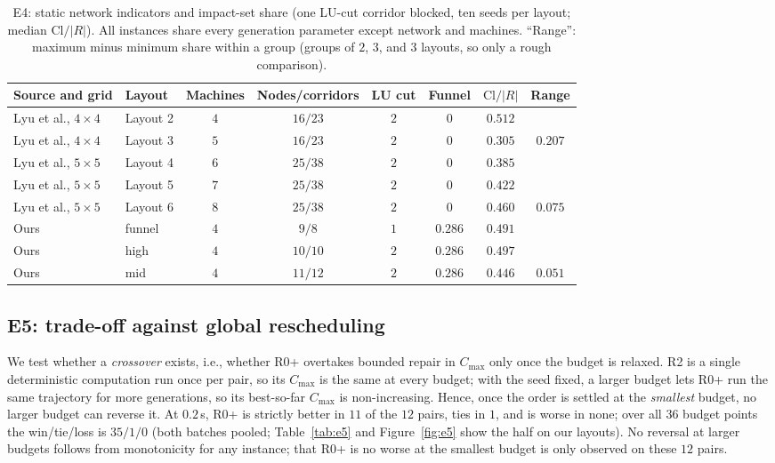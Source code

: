 \documentclass[manuscript,screen,review]{acmart}
\newcommand{\EfiveCells}{12}        %
\newcommand{\EfivePts}{36}          %
\newcommand{\EfiveWLT}{35/1/0}      %
\newcommand{\EfiveWinMin}{11}       %
\newcommand{\EfiveTieMin}{1}        %
\newcommand{\PubCloSpread}{0.207}
\newcommand{\PubCloSpreadBig}{0.075}
\newcommand{\SelfCloSpread}{0.051}
\begin{document}
\begin{table}[t]
\centering
\caption{E4: static network indicators and impact-set share (one LU-cut corridor blocked, ten seeds per layout; median \(\mathrm{Cl}/|R|\)). All instances share every generation parameter except network and machines.
``Range'': maximum minus minimum share within a group (groups of \(2\), \(3\), and \(3\) layouts, so only a rough comparison).}
\label{tab:e4pub}
\small
\begin{tabular}{@{}llcccccc@{}}
\toprule
Source and grid & Layout & Machines & Nodes/corridors & LU cut & Funnel & \(\mathrm{Cl}/|R|\) & Range \\
\midrule
Lyu et al., \(4\times4\) & Layout 2 & \(4\) & \(16/23\) & \(2\) & \(0\) & \(0.512\) & \\
Lyu et al., \(4\times4\) & Layout 3 & \(5\) & \(16/23\) & \(2\) & \(0\) & \(0.305\) & \(\PubCloSpread\) \\
\cmidrule{1-8}
Lyu et al., \(5\times5\) & Layout 4 & \(6\) & \(25/38\) & \(2\) & \(0\) & \(0.385\) & \\
Lyu et al., \(5\times5\) & Layout 5 & \(7\) & \(25/38\) & \(2\) & \(0\) & \(0.422\) & \\
Lyu et al., \(5\times5\) & Layout 6 & \(8\) & \(25/38\) & \(2\) & \(0\) & \(0.460\) & \(\PubCloSpreadBig\) \\
\midrule
Ours & funnel & \(4\) & \(9/8\) & \(1\) & \(0.286\) & \(0.491\) & \\
Ours & high & \(4\) & \(10/10\) & \(2\) & \(0.286\) & \(0.497\) & \\
Ours & mid & \(4\) & \(11/12\) & \(2\) & \(0.286\) & \(0.446\) & \(\SelfCloSpread\) \\
\bottomrule
\end{tabular}
\end{table}

\subsection{E5: trade-off against global rescheduling}
\label{sec:e5}

We test whether a \emph{crossover} exists, i.e., whether R0+ overtakes bounded repair in \(C_{\max}\) only once the budget is relaxed. R2 is a single deterministic computation run once per pair, so its \(C_{\max}\) is the same at every budget;
with the seed fixed, a larger budget lets R0+ run the same trajectory for more generations, so its best-so-far \(C_{\max}\) is non-increasing.
Hence, once the order is settled at the \emph{smallest} budget, no larger budget can reverse it. At \(0.2\)\,s, R0+ is strictly better in \(\EfiveWinMin\) of the \(\EfiveCells\) pairs, ties in \(\EfiveTieMin\), and is worse in none;
over all \(\EfivePts\) budget points the win/tie/loss is \(\EfiveWLT\) (both batches pooled; Table~\ref{tab:e5} and Figure~\ref{fig:e5} show the half on our layouts).
No reversal at larger budgets follows from monotonicity for any instance; that R0+ is no worse at the smallest budget is only observed on these \(\EfiveCells\) pairs.
\end{document}
